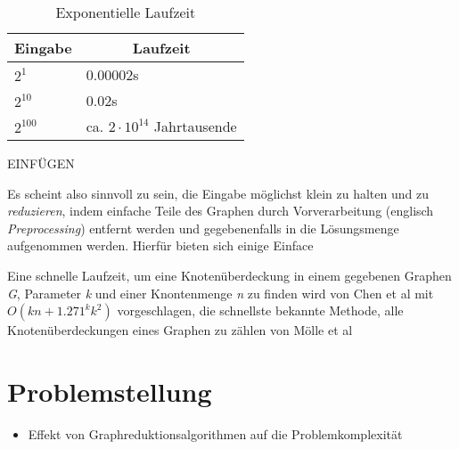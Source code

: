  \begin{table}[htb]
\caption{Exponentielle Laufzeit \label{tab:exponential}}
\vspace*{1em}
\centering

\bgroup
\def\arraystretch{1.3}%

\begin{threeparttable}

\begin{tabular}[c]{ l | l }
	
	\multicolumn{1}{c|}{\textbf{Eingabe}} & 
	\multicolumn{1}{c}{\textbf{Laufzeit}} \\ 
	
	\hline

	$2^{1}$& 0.00002s\\
	$2^{10}$& 0.02s\\
	$2^{100}$& ca. $ 2 \cdot 10^{14} $ Jahrtausende \\
	
\end{tabular}

\begin{tablenotes}\footnotesize
\item EINFÜGEN
\end{tablenotes}

\end{threeparttable}

\egroup

\end{table}
Es scheint also sinnvoll zu sein, die Eingabe möglichst klein zu halten und zu \emph{reduzieren}, indem einfache Teile des Graphen durch Vorverarbeitung (englisch \emph{Preprocessing}) entfernt werden und gegebenenfalls in die Lösungsmenge aufgenommen werden. Hierfür bieten sich einige Einface


Eine schnelle Laufzeit, um eine Knotenüberdeckung in einem gegebenen Graphen \emph{G}, Parameter \emph{k} und einer Knontenmenge \emph{n} zu finden wird von Chen et al \cite{paper:4} mit $O(kn + 1.271^{k}k^{2})$ vorgeschlagen, die schnellste bekannte Methode, alle Knotenüberdeckungen eines Graphen zu zählen von Mölle et al 

\section{Problemstellung}
\label{ch:Einleitung:sec:Problemstellung}

\begin{itemize}
\item Effekt von Graphreduktionsalgorithmen auf die Problemkomplexität
\end{itemize}

